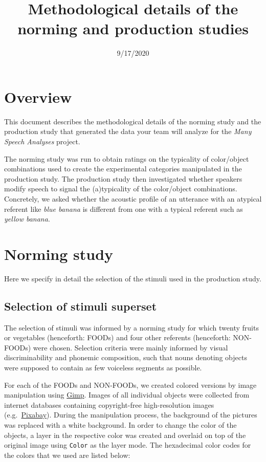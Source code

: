 \documentclass[
  12pt,
]{article}
\title{Methodological details of the norming and production studies}
\author{}
\date{\vspace{-2.5em}9/17/2020}
\begin{document}
\maketitle

{
\setcounter{tocdepth}{2}
\tableofcontents
}
\hypertarget{overview}{%
\section{Overview}\label{overview}}

This document describes the methodological details of the norming study and the production study that generated the data your team will analyze for the \emph{Many Speech Analyses} project.

The norming study was run to obtain ratings on the typicality of color/object combinations used to create the experimental categories manipulated in the production study.
The production study then investigated whether speakers modify speech to signal the (a)typicality of the color/object combinations.
Concretely, we asked whether the acoustic profile of an utterance with an atypical referent like \emph{blue banana} is different from one with a typical referent such as \emph{yellow banana}.

\hypertarget{norming-study}{%
\section{Norming study}\label{norming-study}}

Here we specify in detail the selection of the stimuli used in the production study.

\hypertarget{selection-of-stimuli-superset}{%
\subsection{Selection of stimuli superset}\label{selection-of-stimuli-superset}}

The selection of stimuli was informed by a norming study for which twenty fruits or vegetables (henceforth: FOODs) and four other referents (henceforth: NON-FOODs) were chosen.
Selection criteria were mainly informed by visual discriminability and phonemic composition, such that nouns denoting objects were supposed to contain as few voiceless segments as possible.

For each of the FOODs and NON-FOODs, we created colored versions by image manipulation using \href{http://www.gimp.org}{Gimp}.
Images of all individual objects were collected from internet databases containing copyright-free high-resolution images (e.g.~\href{https://pixabay.com}{Pixabay}).
During the manipulation process, the background of the pictures was replaced with a white background.
In order to change the color of the objects, a layer in the respective color was created and overlaid on top of the original image using \texttt{Color} as the layer mode.
The hexadecimal color codes for the colors that we used are listed below:
\end{document}
